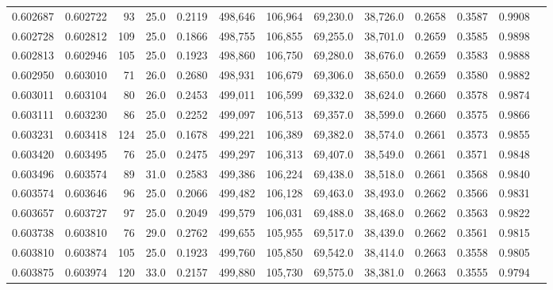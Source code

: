 \begin{tabular}{rrrrrrrrrrrrr}
0.602687 & 0.602722 &    93 & 25.0 &                                     0.2119 & 498,646 & 106,964 &  69,230.0 &  38,726.0 & 0.2658 & 0.3587 & 0.9908 \\
0.602728 & 0.602812 &   109 & 25.0 &                                     0.1866 & 498,755 & 106,855 &  69,255.0 &  38,701.0 & 0.2659 & 0.3585 & 0.9898 \\
0.602813 & 0.602946 &   105 & 25.0 &                                     0.1923 & 498,860 & 106,750 &  69,280.0 &  38,676.0 & 0.2659 & 0.3583 & 0.9888 \\
0.602950 & 0.603010 &    71 & 26.0 &                                     0.2680 & 498,931 & 106,679 &  69,306.0 &  38,650.0 & 0.2659 & 0.3580 & 0.9882 \\
0.603011 & 0.603104 &    80 & 26.0 &                                     0.2453 & 499,011 & 106,599 &  69,332.0 &  38,624.0 & 0.2660 & 0.3578 & 0.9874 \\
0.603111 & 0.603230 &    86 & 25.0 &                                     0.2252 & 499,097 & 106,513 &  69,357.0 &  38,599.0 & 0.2660 & 0.3575 & 0.9866 \\
0.603231 & 0.603418 &   124 & 25.0 &                                     0.1678 & 499,221 & 106,389 &  69,382.0 &  38,574.0 & 0.2661 & 0.3573 & 0.9855 \\
0.603420 & 0.603495 &    76 & 25.0 &                                     0.2475 & 499,297 & 106,313 &  69,407.0 &  38,549.0 & 0.2661 & 0.3571 & 0.9848 \\
0.603496 & 0.603574 &    89 & 31.0 &                                     0.2583 & 499,386 & 106,224 &  69,438.0 &  38,518.0 & 0.2661 & 0.3568 & 0.9840 \\
0.603574 & 0.603646 &    96 & 25.0 &                                     0.2066 & 499,482 & 106,128 &  69,463.0 &  38,493.0 & 0.2662 & 0.3566 & 0.9831 \\
0.603657 & 0.603727 &    97 & 25.0 &                                     0.2049 & 499,579 & 106,031 &  69,488.0 &  38,468.0 & 0.2662 & 0.3563 & 0.9822 \\
0.603738 & 0.603810 &    76 & 29.0 &                                     0.2762 & 499,655 & 105,955 &  69,517.0 &  38,439.0 & 0.2662 & 0.3561 & 0.9815 \\
0.603810 & 0.603874 &   105 & 25.0 &                                     0.1923 & 499,760 & 105,850 &  69,542.0 &  38,414.0 & 0.2663 & 0.3558 & 0.9805 \\
0.603875 & 0.603974 &   120 & 33.0 &                                     0.2157 & 499,880 & 105,730 &  69,575.0 &  38,381.0 & 0.2663 & 0.3555 & 0.9794 \\

\end{tabular}
